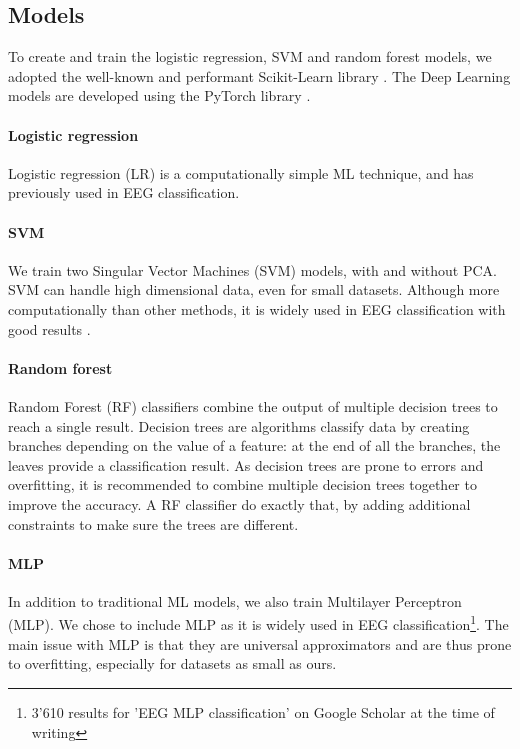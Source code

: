 \documentclass[10pt,conference,compsocconf]{IEEEtran}
\begin{document}
\subsection{Models}
To create and train the logistic regression, SVM and random forest models, we adopted the well-known and performant Scikit-Learn library \cite{scikitlearn}. The Deep Learning models are developed using the PyTorch library \cite{pytorch}.

\paragraph{Logistic regression}
Logistic regression (LR) is a computationally simple ML technique, and has previously used in EEG classification\cite{SUBASI200587, NIPS2006_35937e34}.

\paragraph{SVM}
We train two Singular Vector Machines (SVM) models, with and without PCA. SVM can handle high dimensional data, even for small datasets. Although more computationally than other methods, it is widely used in EEG classification with good results \cite{knn_svm_review}.

\paragraph{Random forest}
Random Forest (RF) classifiers combine the output of multiple decision trees to reach a single result. Decision trees are algorithms classify data by creating branches depending on the value of a feature: at the end of all the branches, the leaves provide a classification result. As decision trees are prone to errors and overfitting, it is recommended to combine multiple decision trees together to improve the accuracy. A RF classifier do exactly that, by adding additional constraints to make sure the trees are different.

\paragraph{MLP}
In addition to traditional ML models, we also train Multilayer Perceptron (MLP). We chose to include MLP as it is widely used in EEG classification\footnote{3'610 results for 'EEG MLP classification' on Google Scholar at the time of writing}. The main issue with MLP is that they are universal approximators and are thus prone to overfitting, especially for datasets as small as ours.
\end{document}
